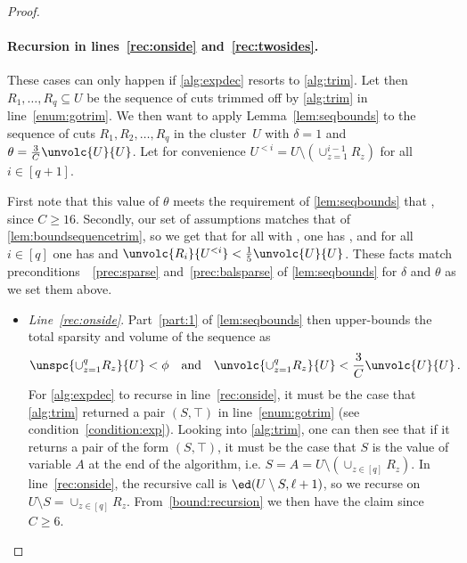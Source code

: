 \begin{proof}
	\paragraph{Recursion in lines~\eqref{rec:onside} and~\eqref{rec:twosides}.} These cases can only happen if \cref{alg:expdec} resorts to \cref{alg:trim}. Let then $R_1,\dots, R_q \subseteq U$ be the sequence of cuts trimmed off by \cref{alg:trim} in line~\eqref{enum:gotrim}. We then want to apply Lemma~\ref{lem:seqbounds} to the sequence of cuts $R_1,R_2, \dots, R_{q}$ in the cluster~$U$ with $\delta=1$ and $\theta = \frac{3}{C}\unvolc{U}{U}$. Let for convenience $U^{<i} = U \setminus (\cup_{z =1}^{i-1} R_z)$ for all $i \in [q+1]$.
	
	First note that this value of $\theta$ meets the requirement of \cref{lem:seqbounds} that , since $C \ge 16$. Secondly, our set of assumptions matches that of \cref{lem:boundsequencetrim}, so we get that for all  with , one has , and for all $i \in [q]$ one has  and $ \unvolc{R_i}{U^{<i}} < \frac{1}{5}\unvolc{U}{U}$. These facts match preconditions~~\eqref{prec:sparse} and~\eqref{prec:balsparse} of \cref{lem:seqbounds} for $\delta$ and $\theta$ as we set them above.
	\begin{itemize}
		\item \emph{Line~\eqref{rec:onside}}. Part~\eqref{part:1} of \cref{lem:seqbounds} then upper-bounds the total sparsity and volume of the sequence as
		\begin{equation}
			\label{bound:recursion}
			\unspc{\cup_{z=1}^{q} R_z}{U} < \phi \quad \text{and} \quad \unvolc{\cup_{z=1}^{q} R_z}{U} < \frac{3}{C}\unvolc{U}{U} \, .
		\end{equation}
		For \cref{alg:expdec} to recurse in line~\eqref{rec:onside}, it must be the case that \cref{alg:trim} returned a pair $(S,\top)$ in line~\eqref{enum:gotrim} (see condition~\eqref{condition:exp}). Looking into \cref{alg:trim}, one can then see that if it returns a pair of the form $(S,\top)$, it must be the case that $S$ is the value of variable $A$ at the end of the algorithm, i.e. $S=A=U \setminus (\cup_{z \in [q]} R_z)$. In line~\eqref{rec:onside}, the recursive call is $\ed(U \setminus S,\ell+1)$, so we recurse on $U \setminus S = \cup_{z \in [q]} R_z$.  From~\eqref{bound:recursion} we then have the claim since $C \ge 6$.
		

\end{itemize}
\end{proof}
